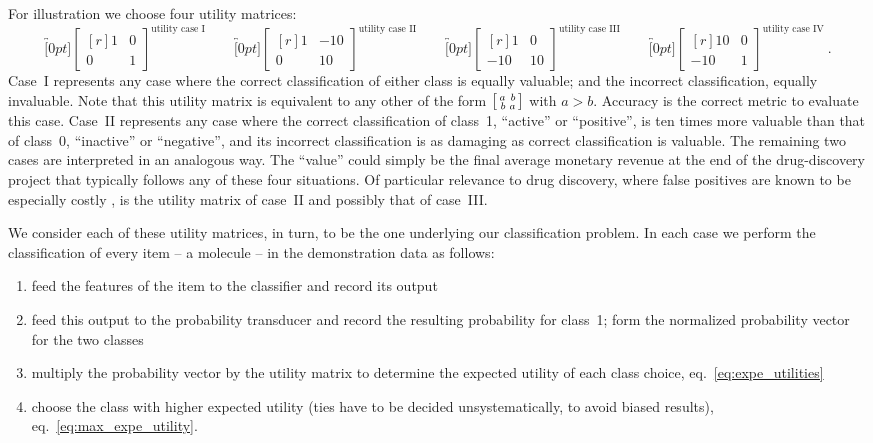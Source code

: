 \documentclass[\ifafour a4paper,12pt,\else a5paper,10pt,\fi%
onecolumn,oneside,article,%
british%
]{memoir}
\theoremstyle{remark}
\theoremstyle{innote}
\renewcommand*{\|}[1][]{\nonscript\:#1\vert\nonscript\:\mathopen{}}
\newcommand*{\sect}{\S}%
\newcommand*{\eqn}{eq.}%
\newcommand*{\umatrix}[4]{\begin{bmatrix*}[r]#1&#2\\#3&#4\end{bmatrix*}}
\newcommand*{\sumatrix}[4]{\begin{bsmallmatrix*}[r]#1&#2\\#3&#4\end{bsmallmatrix*}}
\begin{document}
For illustration we choose four utility matrices:
\begin{equation}
  \label{eq:utility_matrices_demo}
  \overbracket[0pt]{\umatrix{1}{0}{0}{1}}^{\text{utility case I}} \qquad
  \overbracket[0pt]{\umatrix{1}{-10}{0}{10}}^{\text{utility case II}} \qquad
  \overbracket[0pt]{\umatrix{1}{0}{-10}{10}}^{\text{utility case III}} \qquad
  \overbracket[0pt]{\umatrix{10}{0}{-10}{1}}^{\text{utility case IV}} \ .
\end{equation}
Case~I represents any case where the correct classification of either class is equally valuable; and the incorrect classification, equally invaluable. Note that this utility matrix is equivalent to any other of the form $\sumatrix{a}{b}{b}{a}$ with $a>b$. Accuracy is the correct metric to evaluate this case. Case~II represents any case where the correct classification of class~1, \enquote{active} or \enquote{positive}, is ten times more valuable than that of class~0, \enquote{inactive} or \enquote{negative}, and its incorrect classification is as damaging as correct classification is valuable. The remaining two cases are interpreted in an analogous way. The \enquote{value} could simply be the final average monetary revenue at the end of the drug-discovery project that typically follows any of these four situations. Of particular relevance to drug discovery, where false positives are known to be especially costly \autocites{sinketal2010,hingoranietal2019}, is the utility matrix of case~II and possibly that of case~III.

We consider each of these utility matrices, in turn, to be the one underlying our classification problem. In each case we perform the classification of every item -- a molecule -- in the demonstration data as follows:
\begin{enumerate}[label=\arabic*.]
\item feed the features of the item to the classifier and record its output
\item feed this output to the probability transducer and record the resulting probability for class~1; form the normalized probability vector for the two classes 
\item multiply the probability vector by the utility matrix to determine the expected utility of each class choice, \eqn~\eqref{eq:expe_utilities}
\item choose the class with higher expected utility (ties have to be decided unsystematically, to avoid biased results), \eqn~\eqref{eq:max_expe_utility}.
\end{enumerate}
\end{document}

